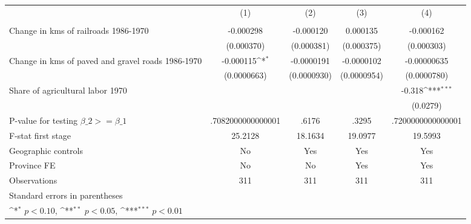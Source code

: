 {
\def\sym#1{\ifmmode^{#1}\else\(^{#1}\)\fi}
\begin{tabular}{l*{4}{c}}
\hline\hline
                &\multicolumn{1}{c}{(1)}&\multicolumn{1}{c}{(2)}&\multicolumn{1}{c}{(3)}&\multicolumn{1}{c}{(4)}\\
                &\multicolumn{1}{c}{}&\multicolumn{1}{c}{}&\multicolumn{1}{c}{}&\multicolumn{1}{c}{}\\
\hline
Change in kms of railroads 1986-1970&-0.000298         &-0.000120         & 0.000135         &-0.000162         \\
                &(0.000370)         &(0.000381)         &(0.000375)         &(0.000303)         \\
[1em]
Change in kms of paved and gravel roads 1986-1970&-0.000115\sym{*}  &-0.0000191         &-0.0000102         &-0.00000635         \\
                &(0.0000663)         &(0.0000930)         &(0.0000954)         &(0.0000780)         \\
[1em]
Share of agricultural labor 1970&                  &                  &                  &   -0.318\sym{***}\\
                &                  &                  &                  & (0.0279)         \\
\hline
P-value for testing $\beta\_{2} >= \beta\_{1}$&.7082000000000001         &    .6176         &    .3295         &.7200000000000001         \\
F-stat first stage&  25.2128         &  18.1634         &  19.0977         &  19.5993         \\
Geographic controls&       No         &      Yes         &      Yes         &      Yes         \\
Province FE     &       No         &       No         &      Yes         &      Yes         \\
Observations    &      311         &      311         &      311         &      311         \\
\hline\hline
\multicolumn{5}{l}{\footnotesize Standard errors in parentheses}\\
\multicolumn{5}{l}{\footnotesize \sym{*} \(p<0.10\), \sym{**} \(p<0.05\), \sym{***} \(p<0.01\)}\\
\end{tabular}
}
